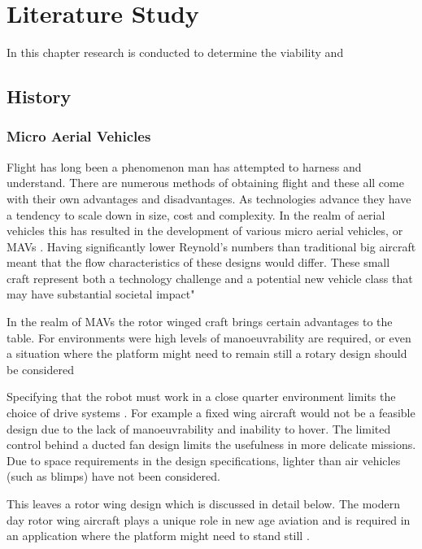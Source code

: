 \chapter{Literature Study}
In this chapter research is conducted to determine the viability and 


\section{History}
	\subsection{Micro Aerial Vehicles}
	Flight has long been a phenomenon man has attempted to harness and understand. There are numerous methods of obtaining flight and these all come with their own advantages and disadvantages. As technologies advance they have a tendency to scale down in size, cost and complexity. In the realm of aerial vehicles this has resulted in the development of various micro aerial vehicles, or MAVs \cite{Leishman}. Having significantly lower Reynold's numbers than traditional big aircraft meant that the flow characteristics of these designs would differ. These small craft represent both a technology challenge and a potential new vehicle class that may have substantial societal impact" \cite{NewMAV}
	
	In the realm of MAVs the rotor winged craft brings certain advantages to the table. For environments were high levels of manoeuvrability are required, or even a situation where the platform might need to remain still a rotary design should be considered \cite{Bohorquez}
	
	
	Specifying that the robot must work in a close quarter environment limits the choice of drive systems \cite{CQAR}. 
	For example a fixed wing aircraft would not be a feasible design due to the lack of manoeuvrability and inability to hover. The limited control behind a ducted fan design limits the usefulness in more delicate missions. Due to space requirements in the design specifications, lighter than air vehicles (such as blimps) have not been considered.
	
	This leaves a rotor wing design which is discussed in detail below. The modern day rotor wing aircraft plays a unique role in new age aviation \cite{Leishman} and is required in an application where the platform might need to stand still \cite{Bohorquez}. 
	
	
